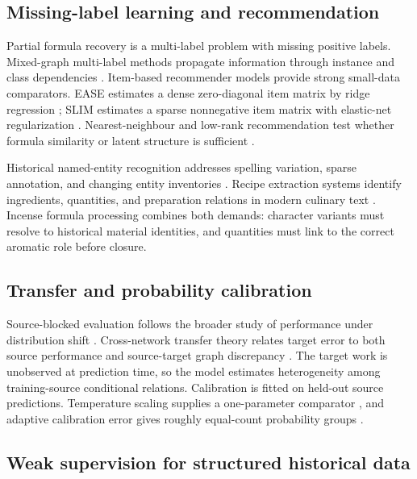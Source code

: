 \documentclass[11pt,a4paper]{article}
\begin{document}
\subsection{Missing-label learning and recommendation}

Partial formula recovery is a multi-label problem with missing positive labels. Mixed-graph multi-label methods propagate information through instance and class dependencies \citep{wu2015mlmg,zhao2018_bayesian_multilabel}. Item-based recommender models provide strong small-data comparators. EASE estimates a dense zero-diagonal item matrix by ridge regression \citep{steck2019ease}; SLIM estimates a sparse nonnegative item matrix with elastic-net regularization \citep{ning2011slim}. Nearest-neighbour and low-rank recommendation test whether formula similarity or latent structure is sufficient \citep{cover1967_nearest_neighbor,cremonesi2010_topn}.

Historical named-entity recognition addresses spelling variation, sparse annotation, and changing entity inventories \citep{sorbi2026_historical_ner}. Recipe extraction systems identify ingredients, quantities, and preparation relations in modern culinary text \citep{goel2024_recipe_ner}. Incense formula processing combines both demands: character variants must resolve to historical material identities, and quantities must link to the correct aromatic role before closure.

\subsection{Transfer and probability calibration}

Source-blocked evaluation follows the broader study of performance under distribution shift \citep{koh2021_wilds}. Cross-network transfer theory relates target error to both source performance and source-target graph discrepancy \citep{wu2023noniid}. The target work is unobserved at prediction time, so the model estimates heterogeneity among training-source conditional relations. Calibration is fitted on held-out source predictions. Temperature scaling supplies a one-parameter comparator \citep{guo2017_calibration}, and adaptive calibration error gives roughly equal-count probability groups \citep{nixon2019calibration}.

\subsection{Weak supervision for structured historical data}
\end{document}
